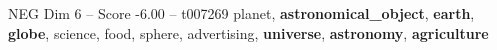 \begin{textsample}{NEG Dim 6 – Score -6.00 – t007269}  \label{ex:f6_neg_029}
planet, \textbf{astronomical\_object}, \textbf{earth}, \textbf{globe}, science, food, sphere, advertising, \textbf{universe}, \textbf{astronomy}, \textbf{agriculture}

\end{textsample}
